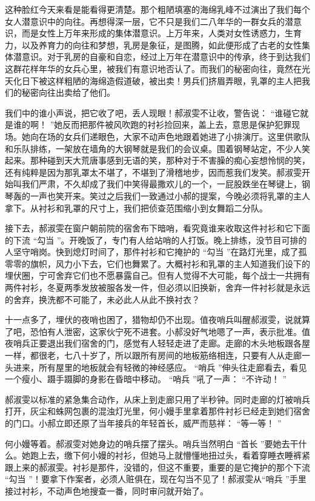 \documentclass[12pt,twoside,openany]{book}
\begin{document}
这种脸红今天来看是能看得更清楚。那个粗陋填塞的海绵乳峰不过演出了我们每个女人潜意识中的向往。再想得深一层，它不只是我们二八年华的一群女兵的潜意识，而是女性上万年来形成的集体潜意识。上万年来，人类对女性诱惑力，生育力，以及养育力的向往和梦想，乳房是象征，是图腾，如此便形成了古老的女性集体潜意识。对于乳房的自豪和自恋，经过上万年在潜意识中的传承，终于到达我们这群花样年华的女兵心里，被我们有意识地否认了。而我们的秘密向往，竟然在光天化日下被这样粗陋的海绵造假道破，被出卖！男兵们挤眉弄眼，乳罩的主人把我们的秘密向往出卖给了他们。

我们中的谁小声说，把它收了吧，丢人现眼！郝淑雯不让收，警告说： “谁碰它就是谁的啊！ ”她反而把那件被风吹跑的衬衫捡回来，盖上去，意思是保护犯罪现场。她向在场的女兵们递眼色，大家不动声色地跟着她进了小排演厅。这里供歌队和乐队排练，一架放在墙角的大钢琴就是我们的会议桌。围着钢琴站定，不少人笑起来。那种碰到天大荒唐事感到无语的笑，那种对于不害臊的痴心妄想怜悯的笑，还有纯粹是因为那乳罩太不堪了，不堪到了滑稽地步，因而惹我们发笑。郝淑雯开始叫我们严肃，不久却成了我们中笑得最撒欢儿的一个，一屁股跌坐在琴键上，钢琴轰的一声也笑开来。笑过之后我们一致通过小郝的提案，今晚必须将乳罩的主人拿下。从衬衫和乳罩的尺寸上，我们把侦查范围缩小到女舞蹈二分队。

接下去，郝淑雯在窗户朝前院的宿舍布下暗哨，看究竟谁来收取这件衬衫和它下面的下流 “勾当 ”。开晚饭了，专门有人给站哨的人打饭。晚上排练，没节目可排的人坚守哨岗。快到熄灯时间了，那件衬衫和它掩护的 “勾当 ”在路灯光里，成了孤零零的旗帜，风力小下去，它们也舞累了。大概衬衫和乳罩的主人知道我们设下的埋伏圈，宁可舍弃它们也不愿暴露自己。但有人觉得不大可能，每个战士一共拥有两件衬衫，冬夏两季发放被服各发一件，但必须以旧换新，舍弃一件衬衫就是永远的舍弃，换洗都不可能了，未必此人从此不换衬衣？

十一点多了，埋伏的夜哨也困了，猎物却仍不出现。值夜哨兵叫醒郝淑雯，说就算了吧，恐怕有人泄密，这家伙宁死不进套。小郝没好气地嗯了一声，表示批准。值夜哨兵正要退出我们宿舍的门，感觉有人轻轻走进了走廊。走廊的木头地板跟各屋一样，都很老，七八十岁了，所以跟所有房间的地板筋络相连，只要有人从走廊一头进来，所有屋里的地板就会有轻微的神经感应。 “哨兵 ”伸头往走廊看去，看见一个瘦小、蹑手蹑脚的身影在昏暗中移动。 “哨兵 ”吼了一声： “不许动！ ”

郝淑雯以标准的紧急集合动作，从床上到走廊只用了半秒钟。同时走廊的灯被哨兵打开，灰尘和蛛网包裹的混浊灯光里，何小嫚手里拿着那件衬衫已经走到她们宿舍的门口。小郝立即还原了当年接兵的年轻首长，威严而慈祥： “等一等！ ”

何小嫚等着。郝淑雯对她身边的哨兵摆了摆头。哨兵当然明白 “首长 ”要她去干什么。她跑上去，缴下何小嫚的衬衫，但她马上就懵懂地扭过头，看着穿睡衣睡裤紧跟上来的郝淑雯。衬衫是那件，没错的，但这不重要，重要的是它掩护的那个下流 “勾当 ”！要拿下作案者，必须人赃俱在，现在勾当不见了！郝淑雯从“哨兵 ”手里接过衬衫，不动声色地搜查一番，同时审问就开始了。
\end{document}

